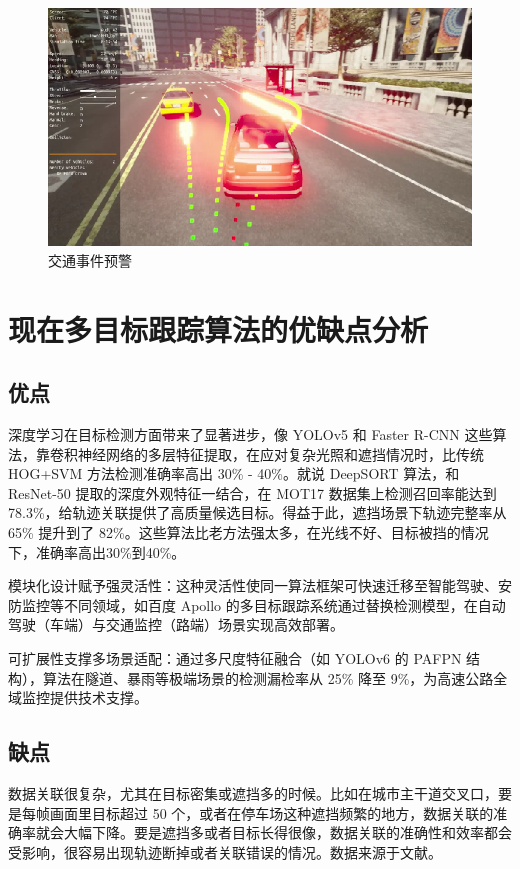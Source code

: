 \begin{figure}[htbp] %
	\centering
	\includegraphics[width=1\textwidth]{p27} %
	\caption{交通事件预警} %
	\label{fig:p27} %
\end{figure}




\section{现在多目标跟踪算法的优缺点分析}

\subsection{优点}
深度学习在目标检测方面带来了显著进步，像 YOLOv5 和 Faster R-CNN 这些算法，靠卷积神经网络的多层特征提取，在应对复杂光照和遮挡情况时，比传统 HOG+SVM 方法检测准确率高出 30\% - 40\%。就说 DeepSORT 算法，和 ResNet-50 提取的深度外观特征一结合，在 MOT17 数据集上检测召回率能达到 78.3\%，给轨迹关联提供了高质量候选目标。得益于此，遮挡场景下轨迹完整率从 65\% 提升到了 82\%。这些算法比老方法强太多，在光线不好、目标被挡的情况下，准确率高出30\%到40\%。

模块化设计赋予强灵活性：这种灵活性使同一算法框架可快速迁移至智能驾驶、安防监控等不同领域，如百度 Apollo 的多目标跟踪系统通过替换检测模型，在自动驾驶（车端）与交通监控（路端）场景实现高效部署\cite{apollo_tracking}。

可扩展性支撑多场景适配：通过多尺度特征融合（如 YOLOv6 的 PAFPN 结构），算法在隧道、暴雨等极端场景的检测漏检率从 25\% 降至 9\%，为高速公路全域监控提供技术支撑\cite{spatiotemporal_gnn}。	

\subsection{缺点}
数据关联很复杂，尤其在目标密集或遮挡多的时候。比如在城市主干道交叉口，要是每帧画面里目标超过 50 个，或者在停车场这种遮挡频繁的地方，数据关联的准确率就会大幅下降。要是遮挡多或者目标长得很像，数据关联的准确性和效率都会受影响，很容易出现轨迹断掉或者关联错误的情况。数据来源于文献\cite{wang2014unified}。

